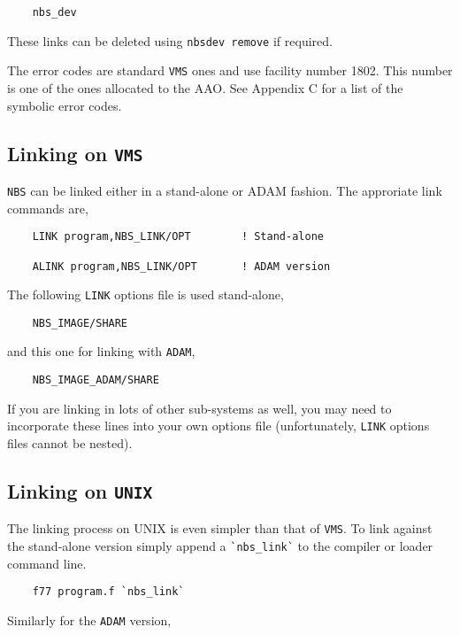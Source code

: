 \documentclass[twoside,11pt]{article}
\renewcommand{\_}{\texttt{\symbol{95}}}
\begin{document}
\begin {verbatim}
    nbs_dev
\end{verbatim}

These links can be deleted using {\tt nbs\_dev remove} if required.

The error codes are standard {\tt VMS} ones and use facility number 1802. This
number is one of the ones allocated to the AAO. See Appendix C for a list of
the symbolic error codes.

\subsection{Linking on {\tt VMS}}

{\tt NBS} can be linked either in a stand-alone or ADAM fashion. The
approriate link commands are,

\begin {verbatim}
    LINK program,NBS_LINK/OPT        ! Stand-alone

    ALINK program,NBS_LINK/OPT       ! ADAM version
\end{verbatim}

The following {\tt LINK} options file is used stand-alone,

\begin {verbatim}
    NBS_IMAGE/SHARE
\end{verbatim}

and this one for linking with {\tt ADAM},

\begin {verbatim}
    NBS_IMAGE_ADAM/SHARE
\end{verbatim}

If you are linking in lots of other sub-systems as well, you may need to
incorporate these lines into your own options file (unfortunately, {\tt LINK}
options files cannot be nested).

\subsection{Linking on {\tt UNIX}}

The linking process on UNIX is even simpler than that of {\tt VMS}. To link 
against the stand-alone version simply append a \verb+`nbs_link`+ to the 
compiler or loader command line.

\begin {verbatim}
    f77 program.f `nbs_link`
\end{verbatim}

Similarly for the {\tt ADAM} version,
\end{document}
